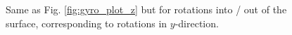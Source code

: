 \documentclass[a4paper]{article}
\begin{document}
\begin{figure}[hbt!]
	\centering
	\quad

	\caption{Same as Fig. \ref{fig:gyro_plot_z} but for rotations into / out of the surface, corresponding to rotations in $y$-direction.}
	\label{fig:gyro_plot_y}
\end{figure}
\end{document}

